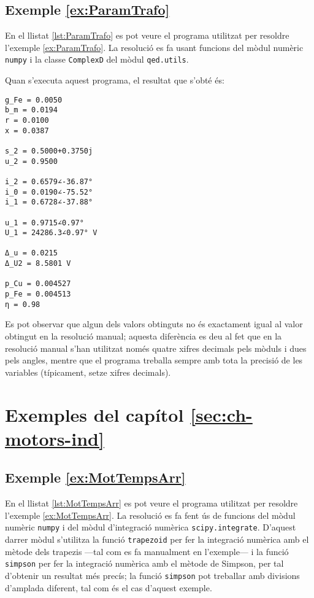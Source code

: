\hypertarget{exemple:ParamTrafo}{\subsection{Exemple \ref*{ex:ParamTrafo} \ParamTrafo}}
En el llistat \vref{lst:ParamTrafo} es pot veure el programa utilitzat per resoldre l'exemple \vref{ex:ParamTrafo}. La resolució es fa usant funcions del mòdul numèric \texttt{numpy} i la classe  \texttt{ComplexD} del mòdul \texttt{qed.utils}.


Quan s'executa aquest programa, el resultat que s'obté és:
\lstset{
	language=,
	numbers=none,
	frame=none
}
\begin{lstlisting}
g_Fe = 0.0050
b_m = 0.0194
r = 0.0100
x = 0.0387

s_2 = 0.5000+0.3750j
u_2 = 0.9500

i_2 = 0.6579∠-36.87°
i_0 = 0.0190∠-75.52°
i_1 = 0.6728∠-37.88°

u_1 = 0.9715∠0.97°
U_1 = 24286.3∠0.97° V

Δ_u = 0.0215
Δ_U2 = 8.5801 V

p_Cu = 0.004527
p_Fe = 0.004513
η = 0.98
\end{lstlisting} 

Es pot observar que algun dels valors obtinguts no és exactament igual al valor obtingut en la resolució manual; aquesta diferència es deu  al fet que en la resolució manual s'han utilitzat només quatre xifres decimals pels mòduls i dues pels angles, mentre que el programa treballa sempre amb tota la precisió de les variables (típicament, setze xifres decimals).




\section{Exemples del capítol \ref*{sec:ch-motors-ind}}

\hypertarget{exemple:MotTempsArr}{\subsection{Exemple \ref*{ex:MotTempsArr} \MotTempsArr}}
En el llistat \vref{lst:MotTempsArr} es pot veure el programa utilitzat per resoldre l'exemple \vref{ex:MotTempsArr}. La resolució es fa fent ús de funcions del mòdul numèric \texttt{numpy} i del mòdul d'integració numèrica \texttt{scipy.integrate}. D'aquest darrer mòdul s'utilitza la funció \texttt{trapezoid} per fer la integració numèrica amb el mètode dels trapezis ---tal com es fa manualment en l'exemple--- i la funció \texttt{simpson} per fer la integració numèrica amb el mètode de Simpson, per tal d'obtenir un resultat més precís; la funció \texttt{simpson} pot treballar amb divisions d'amplada diferent, tal com és el cas d'aquest exemple. 


